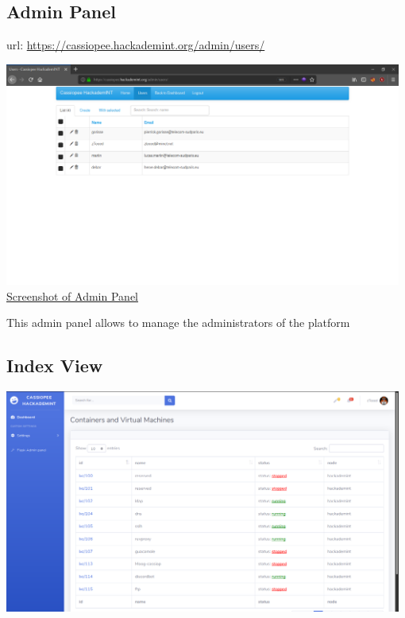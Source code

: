 \subsection{Admin Panel}
url: \url{https://cassiopee.hackademint.org/admin/users/}
\\
\begin{center}
\includegraphics[width=0.98\textwidth]{images/flask-application-0.png}
\\
\underline{Screenshot of Admin Panel}
\end{center}

This admin panel allows to manage the administrators of the platform


\subsection{Index View}
\vspace{1cm}
\begin{center}
\includegraphics[width=0.98\textwidth]{images/flask-application-1.png}
\end{center}

\pagebreak 


